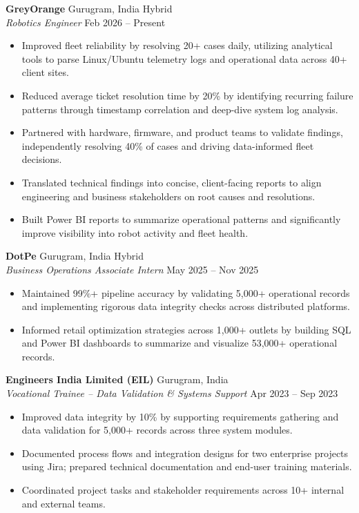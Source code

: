\documentclass[10pt,a4paper]{article}
\begin{document}
\textbf{GreyOrange} \hfill Gurugram, India \textbar{} Hybrid\\
\textit{Robotics Engineer} \hfill Feb 2026 -- Present
\begin{itemize}
  \item Improved fleet reliability by resolving 20+ cases daily, utilizing analytical tools to parse Linux/Ubuntu telemetry logs and operational data across 40+ client sites.
  \item Reduced average ticket resolution time by 20\% by identifying recurring failure patterns through timestamp correlation and deep-dive system log analysis.
  \item Partnered with hardware, firmware, and product teams to validate findings, independently resolving 40\% of cases and driving data-informed fleet decisions.
  \item Translated technical findings into concise, client-facing reports to align engineering and business stakeholders on root causes and resolutions.
  \item Built Power BI reports to summarize operational patterns and significantly improve visibility into robot activity and fleet health.
\end{itemize}

\textbf{DotPe} \hfill Gurugram, India \textbar{} Hybrid\\
\textit{Business Operations Associate Intern} \hfill May 2025 -- Nov 2025
\begin{itemize}
  \item Maintained 99\%+ pipeline accuracy by validating 5,000+ operational records and implementing rigorous data integrity checks across distributed platforms.
  \item Informed retail optimization strategies across 1,000+ outlets by building SQL and Power BI dashboards to summarize and visualize 53,000+ operational records.
\end{itemize}

\textbf{Engineers India Limited (EIL)} \hfill Gurugram, India\\
\textit{Vocational Trainee -- Data Validation \& Systems Support} \hfill Apr 2023 -- Sep 2023
\begin{itemize}
  \item Improved data integrity by 10\% by supporting requirements gathering and data validation for 5,000+ records across three system modules.
  \item Documented process flows and integration designs for two enterprise projects using Jira; prepared technical documentation and end-user training materials.
  \item Coordinated project tasks and stakeholder requirements across 10+ internal and external teams.
\end{itemize}
\end{document}
